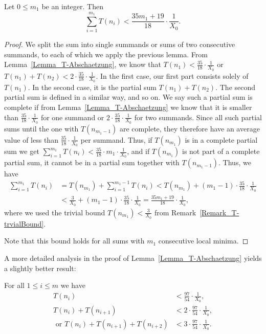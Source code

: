\documentclass[12pt,reqno]{article}
\begin{document}
\begin{lemma}\label{LemmaT_Abschaetzung}
Let $0\leq m_1$ be an integer. Then
\[ \sum_{i=1}^{m_1} T(n_i)<\frac{35m_1+19}{18} \cdot \frac{1}{X_0}.\]
\end{lemma}

\begin{proof}
We split the sum into single summands or sums of two consecutive summands, to each of which we apply the previous lemma. From Lemma~\ref{Lemma_T-Abschaetzung}, we know that $T(n_1)<\tfrac{35}{18} \cdot \tfrac{1}{X_0}$ or $T(n_1)+T(n_2) < 2\cdot \frac{35}{18} \cdot \tfrac{1}{X_0}$. In the first case, our first part consists solely of $T(n_1)$. In the second case, it is the partial sum $T(n_1)+T(n_2)$. The second partial sum is defined in a similar way, and so on. We say such a partial sum is complete if from Lemma~\ref{Lemma_T-Abschaetzung} we know that it is smaller than $\tfrac{35}{18} \cdot \tfrac{1}{X_0}$ for one summand or $2\cdot \tfrac{35}{18} \cdot \tfrac{1}{X_0}$ for two summands. Since all such partial sums until the one with $T(n_{m_1-1})$ are complete, they therefore have an average value of less than $\tfrac{35}{18} \cdot \tfrac{1}{X_0}$ per summand. Thus, if $T(n_{m_1})$ is in a complete partial sum we get $\sum_{i=1}^{m_1} T(n_i)<\frac{35}{18} \cdot m_1 \cdot \tfrac{1}{X_0}$, and if $T(n_{m_1})$ is not part of a complete partial sum, it cannot be in a partial sum together with $T(n_{m_1-1})$. Thus, we have
\begin{align*} 
\sum_{i=1}^{m_1} T(n_i)&= T(n_{m_1}) + \sum_{i=1}^{m_1-1} T(n_i)< T(n_{m_1}) + (m_1-1) \cdot \frac{35}{18} \cdot \frac{1}{X_0} \\
\quad &< \frac{3}{X_0} + (m_1-1) \cdot \frac{35}{18} \cdot \frac{1}{X_0}=\frac{35m_1+19}{18} \cdot \frac{1}{X_0},
\end{align*}
where we used the trivial bound $T(n_{m_1}) < \tfrac{3}{X_0}$ from Remark~\ref{Remark_T-trvialBound}.

Note that this bound holds for all sums with $m_1$ consecutive local minima.
\end{proof}

A more detailed analysis in the proof of Lemma~\ref{Lemma_T-Abschaetzung} yields a slightly better result:

\begin{corollary}\label{Korrolar_besserTAbschaetzung}
For all $1\leq i\leq m$ we have 
\begin{align*}
T(n_i)&<\frac{97}{54} \cdot \frac{1}{X_0},\\ 
T(n_i)+T(n_{i+1})&<2 \cdot \frac{97}{54} \cdot \frac{1}{X_0}, \\
\text{ or } T(n_i)+T(n_{i+1})+T(n_{i+2})&<3 \cdot \frac{97}{54} \cdot \frac{1}{X_0}.
\end{align*}
\end{corollary}
\end{document}
